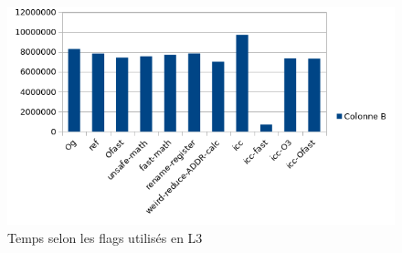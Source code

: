 \documentclass{report}
\begin{document}
   \begin{figure}[ht!]
        \centering
        \includegraphics[width=120mm]{MEDIA/Resultat_TEST_L3.png}
        \caption{Temps selon les flags utilisés en L3}
    \end{figure}

\end{document}
